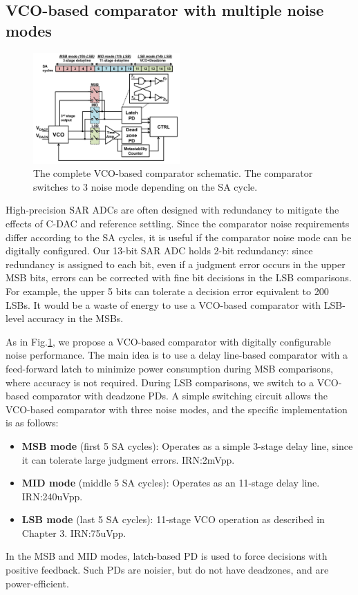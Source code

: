 \documentclass[journal]{IEEEtran}
\begin{document}
\subsection{VCO-based comparator with multiple noise modes}
\begin{figure}[!]
\centering
\includegraphics[width=0.5\textwidth]{figs/vco-entire.png}
\caption{The complete VCO-based comparator schematic. The comparator switches to 3 noise mode depending on the SA cycle.}
\label{fullvco}
\end{figure}

High-precision SAR ADCs are often designed with redundancy to mitigate the effects of C-DAC and reference settling. Since the comparator noise requirements differ according to the SA cycles, it is useful if the comparator noise mode can be digitally configured.
Our 13-bit SAR ADC holds 2-bit redundancy: since redundancy is assigned to each bit, even if a judgment error occurs in the upper MSB bits, errors can be corrected with fine bit decisions in the LSB comparisons\cite{kapusta201314b}. For example, the upper 5 bits can tolerate a decision error equivalent to 200 LSBs. It would be a waste of energy to use a VCO-based comparator with LSB-level accuracy in the MSBs.

As in Fig.\ref{fullvco}, we propose a VCO-based comparator with digitally configurable noise performance. 
The main idea is to use a delay line-based comparator with a feed-forward latch to minimize power consumption during MSB comparisons, where accuracy is not required. During LSB comparisons, we switch to a VCO-based comparator with deadzone PDs. A simple switching circuit allows the VCO-based comparator with three noise modes, and the specific implementation is as follows:
\begin{itemize}
\item \textbf{MSB mode} (first 5 SA cycles): Operates as a simple 3-stage delay line, since it can tolerate large judgment errors. IRN:2mVpp.
\item \textbf{MID mode} (middle 5 SA cycles): Operates as an 11-stage delay line. IRN:240uVpp.
\item \textbf{LSB mode} (last 5 SA cycles): 11-stage VCO operation as described in Chapter 3. IRN:75uVpp.
\end{itemize}
In the MSB and MID modes, latch-based PD is used to force decisions with positive feedback. Such PDs are noisier, but do not have deadzones, and are power-efficient.
\end{document}
